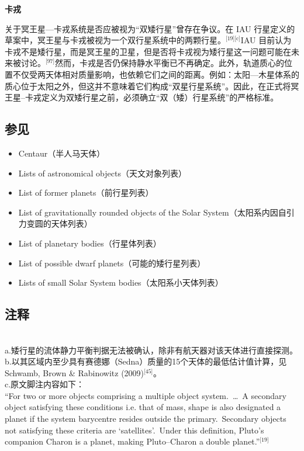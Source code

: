 \textbf{卡戎}

关于冥王星—卡戎系统是否应被视为“双矮行星”曾存在争议。在 IAU 行星定义的草案中，冥王星与卡戎被视为一个双行星系统中的两颗行星。\(^\text{[19][c]}\)IAU 目前认为卡戎不是矮行星，而是冥王星的卫星，但是否将卡戎视为矮行星这一问题可能在未来被讨论。\(^\text{[97]}\)然而，卡戎是否仍保持静水平衡已不再确定。此外，轨道质心的位置不仅受两天体相对质量影响，也依赖它们之间的距离。例如：太阳—木星体系的质心位于太阳之外，但这并不意味着它们构成“双星行星系统”。因此，在正式将冥王星–卡戎定义为双矮行星之前，必须确立“双（矮）行星系统”的严格标准。
\subsection{参见}
\begin{itemize}
\item Centaur（半人马天体）\\
\item Lists of astronomical objects（天文对象列表）\\
\item List of former planets（前行星列表）\\
\item List of gravitationally rounded objects of the Solar System（太阳系内因自引力变圆的天体列表）\\
\item List of planetary bodies（行星体列表）\\
\item List of possible dwarf planets（可能的矮行星列表）\\
\item Lists of small Solar System bodies（太阳系小天体列表）
\end{itemize}
\subsection{注释}\\
a.矮行星的流体静力平衡判据无法被确认，除非有航天器对该天体进行直接探测。\\
b.以其区域内至少具有赛德娜（Sedna）质量的15个天体的最低估计值计算，见 Schwamb, Brown \& Rabinowitz (2009)\(^\text{[45]}\)。\\
c.原文脚注内容如下：\\
“For two or more objects comprising a multiple object system.~…~A secondary object satisfying these conditions i.e. that of mass, shape is also designated a planet if the system barycentre resides outside the primary.~Secondary objects not satisfying these criteria are ‘satellites’.~Under this definition, Pluto’s companion Charon is a planet, making Pluto–Charon a double planet.”\(^\text{[19]}\)

